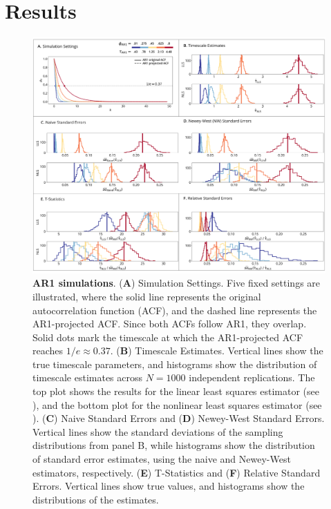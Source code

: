 \documentclass[latex/main.tex]{subfiles}
\begin{document}
\section{Results}

\begin{figure}[H]
    \centering
    \includegraphics[width=1\textwidth]{latex/results/fig01-ar1.png} 
    \caption{
    \textbf{AR1 simulations}.
    (\textbf{A}) Simulation Settings. Five fixed settings are illustrated, where the solid line represents the original autocorrelation function (ACF), and the dashed line represents the AR1-projected ACF. Since both ACFs follow AR1, they overlap. Solid dots mark the timescale at which the AR1-projected ACF reaches $1/e \approx 0.37$.
    (\textbf{B}) Timescale Estimates. Vertical lines show the true timescale parameters, and histograms show the distribution of timescale estimates across $N=1000$ independent replications. The top plot shows the results for the linear least squares estimator (see ), and the bottom plot for the nonlinear least squares estimator (see ).
    (\textbf{C}) Naive Standard Errors and (\textbf{D}) Newey-West Standard Errors. Vertical lines show the standard deviations of the sampling distributions from panel B, while histograms show the distribution of standard error estimates, using the naive and Newey-West estimators, respectively.
    (\textbf{E}) T-Statistics and (\textbf{F}) Relative Standard Errors. Vertical lines show true values, and histograms show the distributions of the estimates.
    }
    \label{fig:sim-ar1}
\end{figure}
\end{document}
